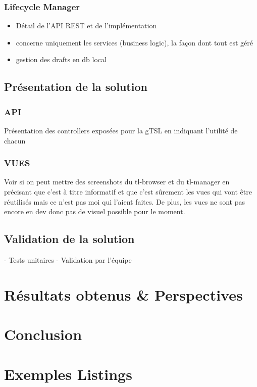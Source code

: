 \documentclass{tnreport}
\begin{document}
\subsection{Lifecycle Manager}

\begin{itemize}
	\item Détail de l'API REST et de l'implémentation
	\item concerne uniquement les services (business logic), la façon dont tout est géré
	\item gestion des drafts en db local
\end{itemize}

\section{Présentation de la solution}

\subsection{API}
Présentation des controllers exposées pour la gTSL en indiquant l'utilité de chacun

\subsection{VUES}
Voir si on peut mettre des screenshots du tl-browser et du tl-manager en précisant que c'est à titre informatif et que c'est sûrement les vues qui vont être réutilisés mais ce n'est pas moi qui l'aient faites. De plus, les vues ne sont pas encore en dev donc pas de visuel possible pour le moment.

\section{Validation de la solution}

- Tests unitaires
- Validation par l'équipe

\chapter{Résultats obtenus \& Perspectives}

\chapter{Conclusion}

\cleardoublepage

\chapter{Exemples Listings}
\end{document}
